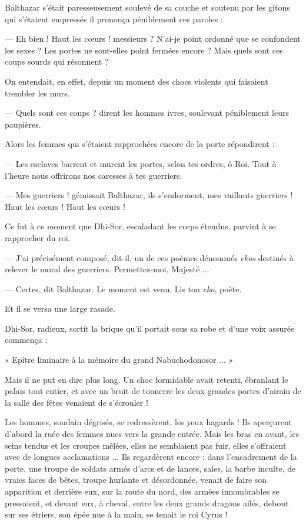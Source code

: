 \documentclass[a4paper, 11pt, oneside, polutonikogreek, french]{article}
\begin{document}
Balthazar s'était paresseusement soulevé de sa couche et soutenu par les gitons qui s'étaient empressés il prononça péniblement ces paroles :

--- Eh bien ! Haut les cœurs ! messieurs ? N'ai-je point ordonné que se confondent les sexes ? Les portes ne sont-elles point fermées encore ? Mais quels sont ces coups sourds qui résonnent ?

On entendait, en effet, depuis un moment des chocs violents qui faisaient trembler les murs.

--- Quels sont ces coups ? dirent les hommes ivres, soulevant péniblement leurs paupières.

Alors les femmes qui s'étaient rapprochées encore de la porte répondirent :

--- Les esclaves barrent et murent les portes, selon tes ordres, ô Roi. Tout à l'heure nous offrirons nos caresses à tes guerriers.

--- Mes guerriers ! gémissait Balthazar, ils s'endorment, mes vaillants guerriers ! Haut les cœurs ! Haut les cœurs !

\bigskip
\centerline{\EightStarTaper}
\centerline{\EightStarTaper\EightStarTaper}
\bigskip

Ce fut à ce moment que Dhi-Sor, escaladant les corps étendus, parvint à se rapprocher du roi.

--- J'ai précisément composé, dit-il, un de ces poèmes dénommés \emph{ekos} destinés à relever le moral des guerriers. Permettez-moi, Majesté ...

--- Certes, dit Balthazar. Le moment est venu. Lis ton \emph{eko}, poète.

Et il se versa une large rasade.

Dhi-Sor, radieux, sortit la brique qu'il portait sous sa robe et d'une voix assurée commença :

« Epître liminaire à la mémoire du grand Nabuchodonosor ... »

Mais il ne put en dire plus long. Un choc formidable avait retenti, ébranlant le palais tout entier, et avec un bruit de tonnerre les deux grandes portes d'airain de la salle des fêtes venaient de s'écrouler !

Les hommes, soudain dégrisés, se redressèrent, les yeux hagards ! Ils aperçurent d'abord la ruée des femmes nues vers la grande entrée. Mais les bras en avant, les seins tendus et les croupes mêlées, elles ne semblaient pas fuir, elles s'offraient avec de longues acclamations ... Ils regardèrent encore : dans l'encadrement de la porte, une troupe de soldats armés d'arcs et de lances, sales, la barbe inculte, de vraies faces de bêtes, troupe hurlante et désordonnée, venait de faire son apparition et derrière eux, sur la route du nord, des armées innombrables se pressaient, et devant eux, à cheval, entre les deux grands dragons ailés, debout sur ses étriers, son épée nue à la main, se tenait le roi Cyrus !
\end{document}
